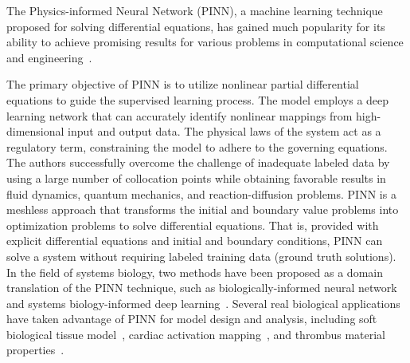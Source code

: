 The Physics-informed Neural Network (PINN), a machine learning technique proposed for solving differential equations, has gained much popularity for its ability to achieve promising results for various problems in computational science and engineering~\cite{cai2022physics,misyris2020physics,cai2021physics,ji2021stiff,zanardi2022towards,lu2022deep,lv2021novel,sun2020surrogate,raissi2019deep,jin2021nsfnets,kissas2020machine,sahli2020physics}.

The primary objective of PINN is to utilize nonlinear partial differential equations to guide the supervised learning process. The model employs a deep learning network that can accurately identify nonlinear mappings from high-dimensional input and output data. The physical laws of the system act as a regulatory term, constraining the model to adhere to the governing equations. The authors successfully overcome the challenge of inadequate labeled data by using a large number of collocation points while obtaining favorable results in fluid dynamics, quantum mechanics, and reaction-diffusion problems. PINN is a meshless approach that transforms the initial and boundary value problems into optimization problems to solve differential equations.
That is, provided with explicit differential equations and initial and boundary conditions, PINN can solve a system without requiring labeled training data (ground truth solutions).
In the field of systems biology, two methods have been proposed as a domain translation of the PINN technique, such as 
biologically-informed neural network~\cite{lagergren2020biologically,greene2020biologically} and systems biology-informed deep learning~\cite{yazdani2020systems}.
Several real biological applications have taken advantage of PINN for model design and analysis, including soft biological tissue model~\cite{liu2020generic}, cardiac activation mapping~\cite{sahli2020physics}, and thrombus material properties~\cite{yin2021non}.


